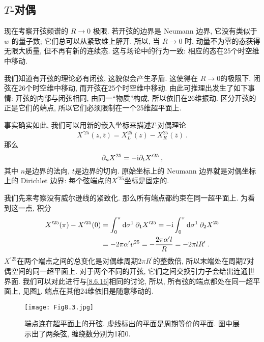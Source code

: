 \subsection*{$T$-对偶}

现在考察开弦频谱的 $R \rightarrow 0$ 极限. 若开弦的边界是 Neumann 边界, 它没有类似于 $w$ 的量子数; 它们总可以从紧致维上解开. 
所以, 当 $R \rightarrow 0$ 时, 动量不为零的态获得无限大质量, 但不再有新的连续态. 这与场论中的行为一致: 相应的态在25个时空维中移动.

我们知道有开弦的理论必有闭弦, 这貌似会产生矛盾. 这使得在 $R \rightarrow 0$的极限下, 闭弦在26个时空维中移动, 而开弦在25个时空维中移动. 
由此可推理出发生了如下事情: 开弦的内部与闭弦相同, 由同一“物质”构成, 所以依旧在26维振动. 区分开弦的正是它们的端点, 
所以它们必须限制在一个25维超平面上. 

事实确实如此, 我们可以用新的嵌入坐标来描述$T$-对偶理论
\begin{equation}
	X^{\prime 25}(z, \bar{z})=X_{L}^{25}(z)-X_{R}^{25}(\bar{z}) \:. \label{8.6.14}
\end{equation}
那么
\begin{equation}
	\partial_{n} X^{25}=-\mathrm{i} \partial_{t} X^{\prime 25} \:, \label{8.6.15}
\end{equation}
其中 $n$是边界的法向,  $t$是边界的切向. 原始坐标上的 Neumann 边界就是对偶坐标上的 Dirichlet 边界: 每个弦端点的$X^{\prime 25}$坐标是固定的. 

我们先来考察没有威尔逊线的紧致化. 那么所有端点都约束在同一超平面上. 为看到这一点, 积分
\begin{align}
		X^{\prime 25}(\pi)-X^{\prime 25}(0) &= \int_{0}^{\pi} \mathrm{d} \sigma^{1}\: \partial_{1} X^{\prime 25}
											 = -\mathrm{i} \int_{0}^{\pi} \mathrm{d} \sigma^{1}\: \partial_{2} X^{25} \nonumber \\
											&= -2 \pi \alpha^{\prime} v^{25}
											 = -\frac{2 \pi \alpha^{\prime} l}{R}=-2 \pi l R^{\prime} \:. \label{8.6.16}
\end{align}
$X^{\prime 25}$在两个端点之间的总变化是对偶维周期$2 \pi R^{\prime}$的整数倍, 所以末端处在周期$T$对偶空间的同一超平面上. 
对于两个不同的开弦, 它们之间交换引力子会给出连通世界面. 我们可以对此进行与\eqref{8.6.16}相同的讨论, 所以, 所有弦的端点都处在同一超平面上, 
见图\ref{Fig8.3}. 端点在其他24维依旧是随意移动的.

\begin{figure}[h]
	\begin{center}
		\texttt{[image: Fig8.3.jpg]}
		\caption{端点连在超平面上的开弦. 虚线标出的平面是周期等价的平面. 图中展示出了两条弦, 缠绕数分别为1和0.}\label{Fig8.3}
	\end{center}
\end{figure}

